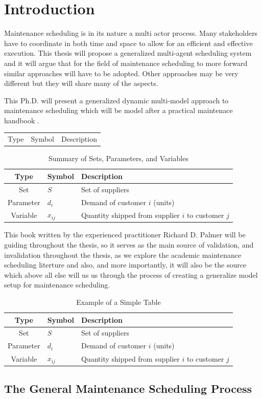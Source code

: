 \chapter{Introduction}
Maintenance scheduling is in its nature a multi actor process. Many stakeholders have to coordinate in both time and space to allow for an
efficient and effective execution. This thesis will propose a generalized multi-agent scheduling system and it will argue that for the field of
maintenance scheduling to more forward similar approaches will have to be adopted. Other approaches may be very different but they will share many 
of the aspects. 

This Ph.D. will present a generalized dynamic multi-model approach to maintenance scheduling which will be model after a practical maintenace handbook \cite{palmer_maintenance_2019}.
\begin{table}
	\begin{tabular}{@{}cll@{}}
		\toprule
		Type & Symbol & Description \\

	\end{tabular}
\end{table}
\begin{table}[ht]
\centering
\caption{Summary of Sets, Parameters, and Variables}
\label{tab:model_elements}
\begin{tabular}{@{}cll@{}} %
\toprule
Type & Symbol & Description \\
\midrule
Set & \( S \) & Set of suppliers \\
Parameter & \( d_i \) & Demand of customer \( i \) (units) \\
Variable & \( x_{ij} \) & Quantity shipped from supplier \( i \) to customer \( j \) \\
\bottomrule
\end{tabular}
\end{table}
This book written by the experienced practitioner Richard D. Palmer will be guiding throughout the thesis, so it serves as the main source of validation, 
and invalidation throughout the thesis, as we explore the academic maintenance scheduling literture and also, and more importantly, it will also be the source 
which above all else will us us through the process of creating a generalize model setup for maintenance scheduling.
\begin{table}
    \centering
    \caption{Example of a Simple Table}
    \label{tab:example_table}
    \begin{tabular}{@{}cll@{}}
        \toprule
        Type & Symbol & Description \\
        \midrule
        Set & \( S \) & Set of suppliers \\
        Parameter & \( d_i \) & Demand of customer \( i \) (units) \\
        Variable & \( x_{ij} \) & Quantity shipped from supplier \( i \) to customer \( j \) \\
        \bottomrule
    \end{tabular}
\end{table}\section{The General Maintenance Scheduling Process}
